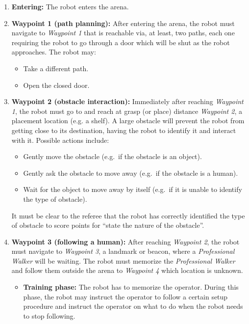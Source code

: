 \begin{enumerate}
	\item \textbf{Entering:} The robot enters the arena.

	\item \textbf{Waypoint 1 (path planning):} After entering the arena, the robot must navigate to \textit{Waypoint 1} that is reachable via, at least, two paths, each one requiring the robot to go through a door which will be shut as the robot approaches. The robot may:
	\begin{itemize}
		\item Take a different path.
		\item Open the closed door.
	\end{itemize}

	\item \textbf{Waypoint 2 (obstacle interaction):} Immediately after reaching \textit{Waypoint 1}, the robot must go to and reach at grasp (or place) distance \textit{Waypoint 2}, a placement location (e.g. a shelf). A large obstacle will prevent the robot from getting close to its destination, having the robot to identify it and interact with it.
	Possible actions include:
	\begin{itemize}
		\item Gently move the obstacle (e.g.~if the obstacle is an object).
		\item Gently ask the obstacle to move away (e.g.~if the obstacle is a human).
		\item Wait for the object to move away by itself (e.g.~if it is unable to identify the type of obstacle).
	\end{itemize}
	It must be clear to the referee that the robot has correctly identified the type of obstacle to score points for ``state the nature of the obstacle''. 

	\item \textbf{Waypoint 3 (following a human):} After reaching \textit{Waypoint 2}, the robot must navigate to \textit{Waypoint 3}, a landmark or beacon, where a \textit{Professional Walker} will be waiting. The robot must memorize the \textit{Professional Walker} and follow them outside the arena to \textit{Waypoint 4} which location is unknown.
	\begin{itemize}
		\item \textbf{Training phase:} The robot has to memorize the operator. During this phase, the robot may instruct the operator to follow a certain setup procedure and instruct the operator on what to do when the robot needs to stop following.
		

\end{itemize}
\end{enumerate}
